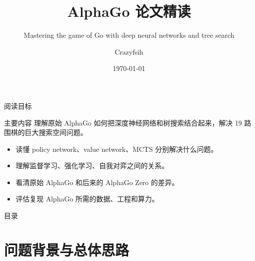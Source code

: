 \documentclass[UTF8,aspectratio=169,10pt]{ctexbeamer}
\title[AlphaGo 论文精读]{AlphaGo 论文精读}
\subtitle{Mastering the game of Go with deep neural networks and tree search}
\author{Crazyfsih}
\date{\today}
\begin{document}
\begin{frame}
  \titlepage
\end{frame}

\begin{frame}{阅读目标}
  \begin{block}{主要内容}
    理解原始 AlphaGo 如何把深度神经网络和树搜索结合起来，解决 19 路围棋的巨大搜索空间问题。
  \end{block}

  \begin{itemize}
    \item 读懂 policy network、value network、MCTS 分别解决什么问题。
    \item 理解监督学习、强化学习、自我对弈之间的关系。
    \item 看清原始 AlphaGo 和后来的 AlphaGo Zero 的差异。
    \item 评估复现 AlphaGo 所需的数据、工程和算力。
  \end{itemize}
\end{frame}

\begin{frame}{目录}
  \tableofcontents
\end{frame}

\section{问题背景与总体思路}
\end{document}
